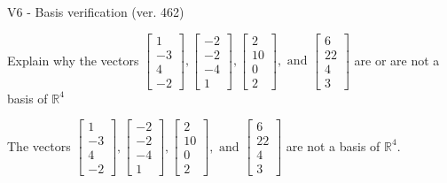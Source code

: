 \begin{exercise}
  \begin{exerciseTitle}V6 - Basis verification (ver. 462)\end{exerciseTitle}
  \begin{exerciseStatement}
    Explain why the vectors \(\left[\begin{array}{r}
1 \\
-3 \\
4 \\
-2
\end{array}\right] , \left[\begin{array}{r}
-2 \\
-2 \\
-4 \\
1
\end{array}\right] , \left[\begin{array}{r}
2 \\
10 \\
0 \\
2
\end{array}\right] , \text{ and } \left[\begin{array}{r}
6 \\
22 \\
4 \\
3
\end{array}\right]\) are or are not a basis of \(\mathbb{R}^4\)	


  \end{exerciseStatement}
  \begin{exerciseAnswer}
   The vectors \(\left[\begin{array}{r}
1 \\
-3 \\
4 \\
-2
\end{array}\right] , \left[\begin{array}{r}
-2 \\
-2 \\
-4 \\
1
\end{array}\right] , \left[\begin{array}{r}
2 \\
10 \\
0 \\
2
\end{array}\right] , \text{ and } \left[\begin{array}{r}
6 \\
22 \\
4 \\
3
\end{array}\right]\) 
  	 are not  a basis of \(\mathbb{R}^4\).
  


  \end{exerciseAnswer}
\end{exercise}